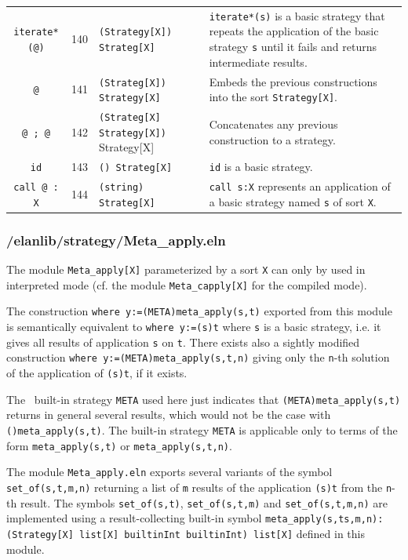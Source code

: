 \begin{tabular}{|c|c|p{5cm}|p{}|}
{\tt iterate*(@)}       & 140 & {\tt (Strategy[X]) Strateg[X]} & {\tt iterate*(s)} is a basic strategy that repeats the application of the basic strategy {\tt s} until it fails and returns intermediate results.\\
{\tt @}                 & 141 & {\tt (Strateg[X]) Strategy[X]} & Embeds the previous constructions into the sort {\tt Strategy[X]}.\\
{\tt @ ; @}             & 142 & {\tt (Strateg[X] Strategy[X])} Strategy[X] & Concatenates any previous construction to a strategy.\\
{\tt id}                & 143 & {\tt () Strateg[X]} & {\tt id} is a basic strategy.\\
{\tt call @ : X}        & 144 & {\tt (string) Strateg[X]} & {\tt call s:X} represents an application of a basic strategy named {\tt s} of sort {\tt X}.
\\ \hline
\end{tabular}


\subsubsection{/elanlib/strategy/Meta\_apply.eln}


The module {\tt Meta\_apply[X]} parameterized by a sort {\tt X} can
only by used in interpreted mode (cf. the module {\tt Meta\_capply[X]}
for the compiled mode).  

The construction {\tt where y:=(META)meta\_apply(s,t)} exported from
this module is semantically equivalent to {\tt where y:=(s)t} where
{\tt s} is a basic strategy, i.e. it gives all results of application
{\tt s} on {\tt t}.  There exists also a sightly modified construction
{\tt where y:=(META)meta\_apply(s,t,n)} giving only the {\tt n}-th
solution of the application of {\tt (s)t}, if it exists.  

The \ELAN\ built-in strategy {\tt META} used here just indicates
that {\tt (META)meta\_apply(s,t)} returns in general several results,
which would not be the case with {\tt ()meta\_apply(s,t)}.  The
built-in strategy {\tt META} is applicable only to terms of the form
{\tt meta\_apply(s,t)} or {\tt meta\_apply(s,t,n)}.

The module {\tt Meta\_apply.eln} exports several variants of the
symbol {\tt set\_of(s,t,m,n)} returning a list of {\tt m} results of
the application {\tt (s)t} from the {\tt n}-th result.  The symbols
{\tt set\_of(s,t)}, {\tt set\_of(s,t,m)} and {\tt set\_of(s,t,m,n)}
are implemented using a result-collecting built-in symbol 
{\tt meta\_apply(s,ts,m,n):(Strategy[X] list[X] builtinInt builtinInt)
  list[X]} defined in this module.  


